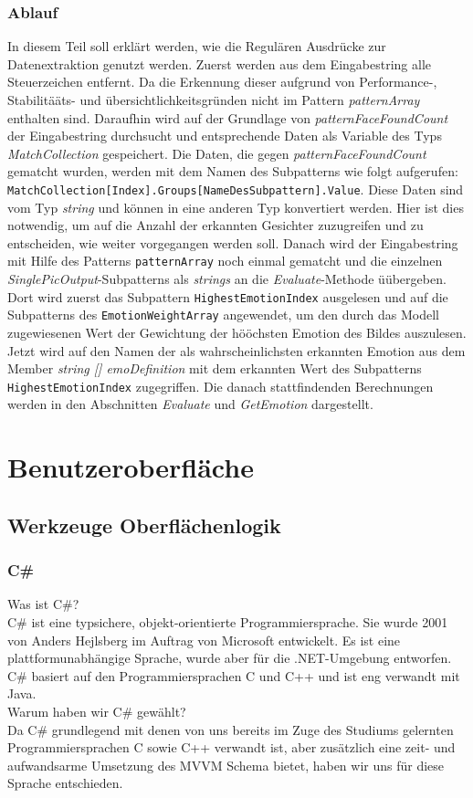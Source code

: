 \documentclass[12pt,a4paper,headinclude,twoside, plainheadsepline, open=right,numbers=noenddot]{scrreprt}
\begin{document}
\subsubsection{Ablauf}
In diesem Teil soll erkl\"{a}rt werden, wie die Regul\"{a}ren Ausdr\"{u}cke zur Datenextraktion genutzt werden. Zuerst werden aus dem Eingabestring alle Steuerzeichen entfernt. Da die Erkennung dieser aufgrund
 von Performance-, Stabilit\"{a}\"{a}ts- und \"{u}bersichtlichkeitsgr\"{u}nden nicht im Pattern \textit{patternArray} enthalten sind. Daraufhin wird auf der Grundlage von \textit{patternFaceFoundCount}
 der Eingabestring durchsucht und entsprechende Daten als Variable des Typs \textit{MatchCollection} gespeichert. Die Daten, die gegen \textit{patternFaceFoundCount} gematcht wurden, werden mit dem Namen
 des Subpatterns wie folgt aufgerufen: \texttt{MatchCollection[Index].Groups[NameDesSubpattern].Value}. Diese Daten sind vom Typ \textit{string} und k\"{o}nnen  in eine anderen Typ konvertiert werden. Hier ist dies notwendig, um auf die Anzahl der erkannten Gesichter zuzugreifen und zu entscheiden, wie weiter vorgegangen werden soll.
 Danach wird der Eingabestring mit Hilfe des Patterns \texttt{patternArray} noch einmal gematcht und die einzelnen \textit{SinglePicOutput}-Subpatterns als \textit{strings} an die \textit{Evaluate}-Methode \"{u}\"{u}bergeben. Dort wird zuerst das Subpattern \texttt{HighestEmotionIndex} ausgelesen und auf die Subpatterns des \texttt{EmotionWeightArray} angewendet, um den durch das Modell zugewiesenen Wert der Gewichtung der h\"{o}\"{o}chsten Emotion des Bildes auszulesen. Jetzt wird auf den Namen der als wahrscheinlichsten erkannten Emotion aus dem Member \textit{string [] emoDefinition} mit dem erkannten Wert des Subpatterns \texttt{HighestEmotionIndex} zugegriffen. Die danach stattfindenden Berechnungen werden in den Abschnitten \textit{Evaluate} und \textit{GetEmotion} dargestellt. 


\section{Benutzeroberfläche}

\subsection{Werkzeuge Oberflächenlogik} %
\subsubsection{C\#}
Was ist C\#? \\
C\# ist eine typsichere, objekt-orientierte Programmiersprache. Sie wurde 2001 von Anders Hejlsberg im Auftrag von Microsoft entwickelt. Es ist eine plattformunabhängige Sprache, wurde aber für die .NET-Umgebung entworfen. C\# basiert auf den Programmiersprachen C und C++ und ist eng verwandt mit Java\cite{Shildt2010}.\\
Warum haben wir C\# gewählt? \\
Da C\# grundlegend mit denen von uns bereits im Zuge des Studiums gelernten Programmiersprachen C sowie C++ verwandt ist, aber zusätzlich eine zeit- und aufwandsarme Umsetzung des MVVM Schema bietet, haben wir uns für diese Sprache entschieden.
\end{document}
